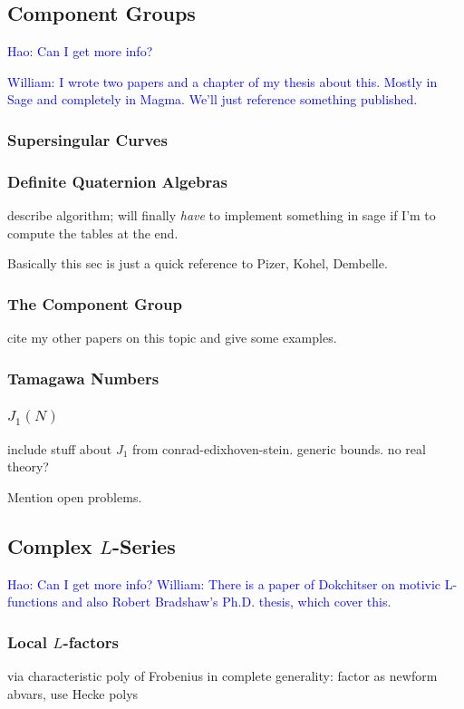 \documentclass{article}
\newcommand{\Hao}[1]{\textcolor{blue}{\textsf{Hao: #1}}}
\newcommand{\wstein}[1]{\textcolor{blue}{\textsf{William: #1}}}
\begin{document}
\subsection{Component Groups}

\Hao{Can I get more info?}

\wstein{I wrote two papers and a chapter of my thesis about this.  Mostly
in Sage and completely in Magma.  We'll just reference something published.}


\subsubsection{Supersingular Curves}

\subsubsection{Definite Quaternion Algebras}
describe algorithm; will finally {\em have} to implement
something in sage if I'm to compute the tables at the end.

Basically this sec is just a quick reference to Pizer, Kohel, Dembelle.

\subsubsection{The Component Group}
cite my other papers on this topic and give some examples.

\subsubsection{Tamagawa Numbers}

\subsubsection{$J_1(N)$}
include stuff about $J_1$ from conrad-edixhoven-stein.  generic
bounds.  no real theory?

Mention open problems.

\subsection{Complex $L$-Series}

\Hao{Can I get more info?}
\wstein{There is a paper of Dokchitser on motivic L-functions and also
Robert Bradshaw's Ph.D. thesis, which cover this.}


\subsubsection{Local $L$-factors}
 via characteristic poly of Frobenius in complete
generality: factor as newform abvars, use Hecke polys
\end{document}
